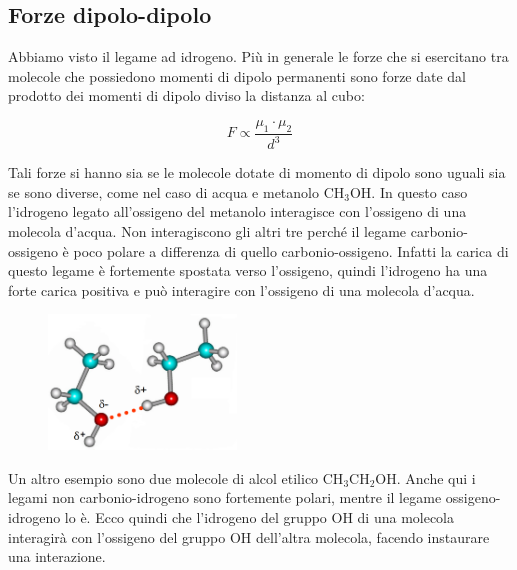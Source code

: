 \subsection{Forze dipolo-dipolo}
Abbiamo visto il legame ad idrogeno. Più in generale le forze che si esercitano tra molecole che possiedono momenti di dipolo permanenti sono forze date dal prodotto dei momenti di dipolo diviso la distanza al cubo:

$$F \propto \frac{\mu_1 \cdot \mu_2}{d^3}$$

Tali forze si hanno sia se le molecole dotate di momento di dipolo sono uguali sia se sono diverse, come nel caso di acqua e metanolo CH$_3$OH. In questo caso l'idrogeno legato all'ossigeno del metanolo interagisce con l'ossigeno di una molecola d'acqua. Non interagiscono gli altri tre perché il legame carbonio-ossigeno è poco polare a differenza di quello carbonio-ossigeno. Infatti la carica di questo legame è fortemente spostata verso l'ossigeno, quindi l'idrogeno ha una forte carica positiva e può interagire con l'ossigeno di una molecola d'acqua.

\hspace{0.5cm}\begin{minipage}{0.35 \textwidth}
    \begin{figure}[H]
        \includegraphics[width=5cm]{immagini/alcol_etilico.png}
    \end{figure}
\end{minipage}
\begin{minipage}{0.6 \textwidth}
    \vspace{0.6cm}Un altro esempio sono due molecole di alcol etilico CH$_3$CH$_2$OH. Anche qui i legami non carbonio-idrogeno sono fortemente polari, mentre il legame ossigeno-idrogeno lo è. Ecco quindi che l'idrogeno del gruppo OH di una molecola interagirà con l'ossigeno del gruppo OH dell'altra molecola, facendo instaurare una interazione.
\end{minipage}

